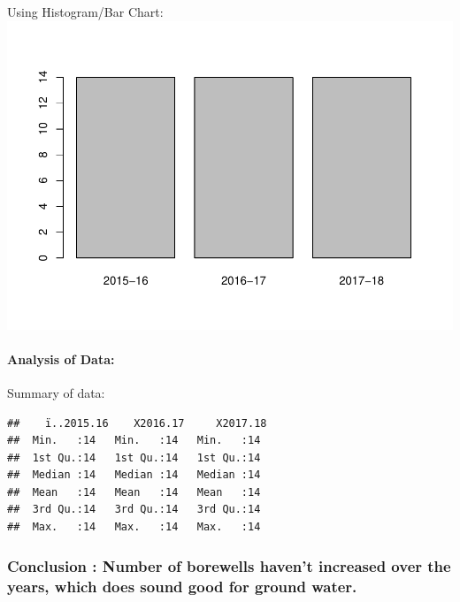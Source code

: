 \documentclass[]{article}
\let\oldparagraph\paragraph
\renewcommand{\paragraph}[1]{\oldparagraph{#1}\mbox{}}
\begin{document}
Using Histogram/Bar Chart:
\includegraphics{Report_files/figure-latex/unnamed-chunk-39-1.pdf}

\paragraph{Analysis of Data:}\label{analysis-of-data-9}

Summary of data:

\begin{verbatim}
##    ï..2015.16    X2016.17     X2017.18 
##  Min.   :14   Min.   :14   Min.   :14  
##  1st Qu.:14   1st Qu.:14   1st Qu.:14  
##  Median :14   Median :14   Median :14  
##  Mean   :14   Mean   :14   Mean   :14  
##  3rd Qu.:14   3rd Qu.:14   3rd Qu.:14  
##  Max.   :14   Max.   :14   Max.   :14
\end{verbatim}

\subsubsection{\texorpdfstring{\textbf{Conclusion} : Number of borewells
haven't increased over the years, which does sound good for ground
water.}{Conclusion : Number of borewells haven't increased over the years, which does sound good for ground water.}}\label{conclusion-number-of-borewells-havent-increased-over-the-years-which-does-sound-good-for-ground-water.}
\end{document}
